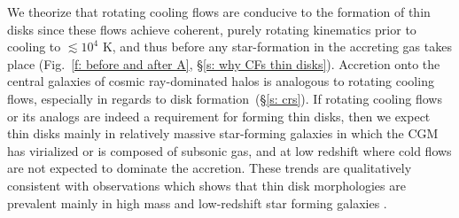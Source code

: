 \documentclass[fleqn,usenatbib]{mnras}
\begin{document}
\begin{enumerate}
We theorize that rotating cooling flows are conducive to the formation of thin disks since these flows achieve coherent, purely rotating kinematics prior to cooling to $\lesssim10^4$ K, and thus before any star-formation in the accreting gas takes place (Fig.~\ref{f: before and after A}, \S\ref{s: why CFs thin disks}).
Accretion onto the central galaxies of cosmic ray-dominated halos is analogous to rotating cooling flows, especially in regards to disk formation~(\S\ref{s: crs}).
If rotating cooling flows or its analogs are indeed a requirement for forming thin disks, then we expect thin disks mainly in relatively massive star-forming galaxies in which the CGM has virialized or is composed of subsonic gas, and at low redshift where cold flows are not expected to dominate the accretion.
These trends are qualitatively consistent with observations which shows that thin disk morphologies are prevalent mainly in high mass and low-redshift star forming galaxies \citep{Kassin2012, Simons2017}. 
    
\end{enumerate}


\end{document}
